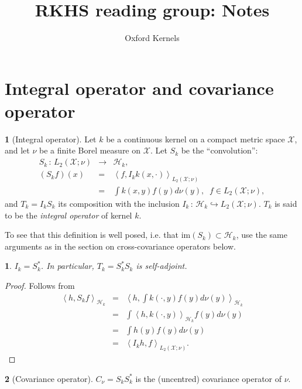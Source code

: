 \documentclass[english]{article}
\theoremstyle{definition}
\newtheorem{defn}{\protect\definitionname}
\theoremstyle{plain}
\newtheorem{fact}{\protect\factname}
\theoremstyle{definition}
\providecommand{\definitionname}{Definition}
\providecommand{\factname}{Fact}
\begin{document}
\title{RKHS reading group: Notes}
\author{Oxford Kernels}
\maketitle

\section{Integral operator and covariance operator}
\begin{defn}
[Integral operator]\emph{ }Let $k$ be a continuous kernel on a
compact metric space $\mathcal{X}$, and let $\nu$ be a finite Borel
measure on $\mathcal{X}$. Let $S_{k}$ be the ``convolution'':
\begin{eqnarray*}
S_{k}\,:\,L_{2}(\mathcal{X};\nu) & \to & \mathcal{H}_{k},\\
\left(S_{k}f\right)\left(x\right) & = & \left\langle f,I_{k}k(x,\cdot)\right\rangle _{L_{2}(\mathcal{X};\nu)}\\
 & = & \int k(x,y)f(y)d\nu(y),\;\;f\in L_{2}(\mathcal{X};\nu),
\end{eqnarray*}
and $T_{k}=I_{k}S_{k}$ its composition with the inclusion $I_{k}\,:\,\mathcal{H}_{k}\hookrightarrow L_{2}(\mathcal{X};\nu)$.
$T_{k}$ is said to be the \emph{integral operator} of kernel $k$.
\end{defn}
To see that this definition is well posed, i.e. that $\text{im}(S_{k})\subset\mathcal{H}_{k}$,
use the same arguments as in the section on cross-covariance operators
below. 
\begin{fact}
$I_{k}=S_{k}^{*}$. In particular, $T_{k}=S_{k}^{*}S_{k}$ is self-adjoint.\end{fact}
\begin{proof}
Follows from
\begin{eqnarray*}
\left\langle h,S_{k}f\right\rangle _{\mathcal{H}_{k}} & = & \left\langle h,\int k(\cdot,y)f(y)d\nu(y)\right\rangle _{\mathcal{H}_{k}}\\
 & = & \int\left\langle h,k(\cdot,y)\right\rangle _{\mathcal{H}_{k}}f(y)d\nu(y)\\
 & = & \int h(y)f(y)d\nu(y)\\
 & = & \left\langle I_{k}h,f\right\rangle _{L_{2}(\mathcal{X};\nu)}.
\end{eqnarray*}
\end{proof}
\begin{defn}
[Covariance operator]$C_{\nu}=S_{k}S_{k}^{*}$ is the (uncentred)
covariance operator of $\nu$.\end{defn}
\end{document}
